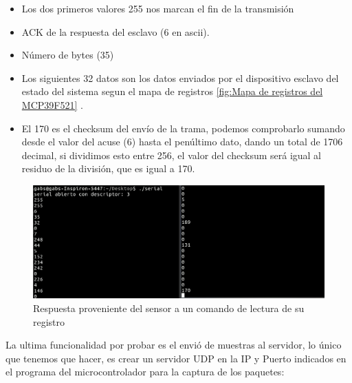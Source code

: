 \begin{itemize}
    \item Los dos primeros valores 255 nos marcan el fin de la transmisión
    \item ACK de la respuesta del esclavo (6 en ascii).
    \item Número de bytes (35)
    \item Los siguientes 32 datos son los datos enviados por el dispositivo esclavo del estado del sistema segun el mapa de registros \ref{fig:Mapa de registros del MCP39F521} .
    \item El 170 es el checksum del envío de la trama, podemos comprobarlo sumando desde el valor del acuse (6) hasta el penúltimo dato, dando un total de 1706 decimal, si dividimos esto entre 256, el valor del checksum será igual al residuo de la división, que es igual a 170.
\end{itemize}

\begin{figure}[H]
	\centering
	\includegraphics[scale=.3]{Capitulo5/images/consola.png}
	\caption{Respuesta proveniente del sensor a un comando de lectura de su registro}
	\label{fig:consola}
\end{figure} 

La ultima funcionalidad por probar es el envió de muestras al servidor, lo único que tenemos que hacer, es crear un servidor UDP en la IP y Puerto indicados en el programa del microcontrolador para la captura de los paquetes:


